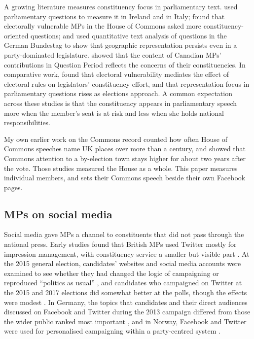 \documentclass[11pt,a4paper]{article}
\begin{document}
A growing literature measures constituency focus in parliamentary text. \citet{martin2011} used parliamentary questions to measure it in Ireland and \citet{russo2011} in Italy; \citet{kellermann2016} found that electorally vulnerable MPs in the House of Commons asked more constituency-oriented questions; and \citet{zittel2019} used quantitative text analysis of questions in the German Bundestag to show that geographic representation persists even in a party-dominated legislature. \citet{soroka2009} showed that the content of Canadian MPs' contributions in Question Period reflects the concerns of their constituencies. In comparative work, \citet{andre2015} found that electoral vulnerability mediates the effect of electoral rules on legislators' constituency effort, and \citet{fernandes2018} that representation focus in parliamentary questions rises as elections approach. A common expectation across these studies is that the constituency appears in parliamentary speech more when the member's seat is at risk and less when she holds national responsibilities.

My own earlier work on the Commons record \citep{hotham2026a,hotham2026c} counted how often House of Commons speeches name UK places over more than a century, and showed that Commons attention to a by-election town stays higher for about two years after the vote. Those studies measured the House as a whole. This paper measures individual members, and sets their Commons speech beside their own Facebook pages.

\subsection{MPs on social media}
Social media gave MPs a channel to constituents that did not pass through the national press. Early studies found that British MPs used Twitter mostly for impression management, with constituency service a smaller but visible part \citep{jackson2011}. At the 2015 general election, candidates' websites and social media accounts were examined to see whether they had changed the logic of campaigning or reproduced ``politics as usual'' \citep{southern2019}, and candidates who campaigned on Twitter at the 2015 and 2017 elections did somewhat better at the polls, though the effects were modest \citep{bright2020}. In Germany, the topics that candidates and their direct audiences discussed on Facebook and Twitter during the 2013 campaign differed from those the wider public ranked most important \citep{stier2018}, and in Norway, Facebook and Twitter were used for personalised campaigning within a party-centred system \citep{enli2013}.
\end{document}
